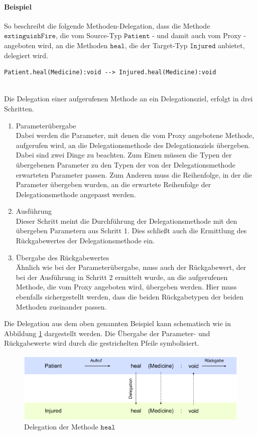\documentclass[a4paper,12pt]{article}
\begin{document}
\paragraph{Beispiel} So beschreibt die folgende Methoden-Delegation, dass die Methode $\texttt{extinguishFire}$, die vom Source-Typ $\texttt{Patient}$ - und damit auch vom Proxy - angeboten wird, an die Methoden $\texttt{heal}$, die der Target-Typ $\texttt{Injured}$ anbietet, delegiert wird.
\begin{lstlisting}[style = dsl]
	Patient.heal(Medicine):void --> Injured.heal(Medicine):void
\end{lstlisting}
\noindent\\
Die Delegation einer aufgerufenen Methode an ein Delegationsziel, erfolgt in drei Schritten.
\begin{enumerate}
\item Parameterübergabe\\
Dabei werden die Parameter, mit denen die vom Proxy angebotene Methode, aufgerufen wird, an die Delegationsmethode des Delegationsziels übergeben. Dabei sind zwei Dinge zu beachten. Zum Einen müssen die Typen der übergebenen Parameter zu den Typen der von der Delegationsmethode erwarteten Parameter passen. Zum Anderen muss die Reihenfolge, in der die Parameter übergeben wurden, an die erwartete Reihenfolge der Delegationsmethode angepasst werden.
\item Ausführung\\
Dieser Schritt meint die Durchführung der Delegationsmethode mit den übergeben Parametern aus Schritt 1. Dies schließt auch die Ermittlung des Rückgabewertes der Delegationsmethode ein.
\item Übergabe des Rückgabewertes\\
Ähnlich wie bei der Parameterübergabe, muss auch der Rückgabewert, der bei der Ausführung in Schritt 2 ermittelt wurde, an die aufgerufenen Methode, die vom Proxy angeboten wird, übergeben werden. Hier muss ebenfalls sichergestellt werden, dass die beiden Rückgabetypen der beiden Methoden zueinander passen.
\end{enumerate}
Die Delegation aus dem oben genannten Beispiel kann schematisch wie in Abbildung \ref{fig:DEL_heal} dargestellt werden. Die Übergabe der Parameter- und Rückgabewerte wird durch die gestrichelten Pfeile symbolisiert.
\begin{figure}[h!]
\includegraphics[width=\linewidth]{MDEL_heal}
\caption{Delegation der Methode $\texttt{heal}$}
\label{fig:DEL_heal}
\end{figure}
\end{document}
